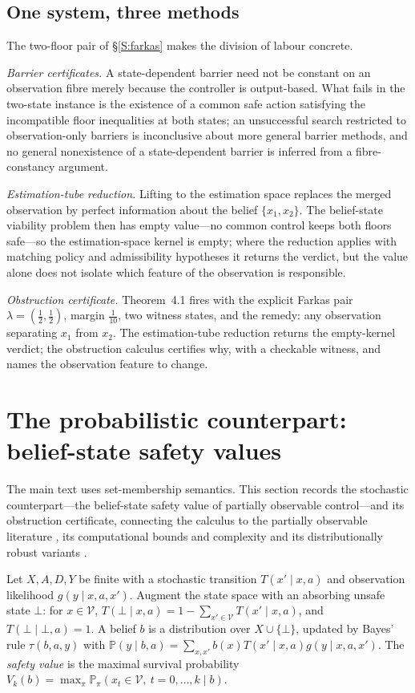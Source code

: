 \documentclass[11pt,a4paper]{article}
\theoremstyle{plain}
\theoremstyle{definition}
\theoremstyle{remark}
\newcommand{\cV}{\mathcal{V}}
\begin{document}
\subsection{One system, three methods}\label{S:threemethods}
The two-floor pair of \S\ref{S:farkas} makes the division of labour concrete.

\emph{Barrier certificates.} A state-dependent barrier need not be constant on an observation fibre merely because the controller is output-based. What fails in the two-state instance is the existence of a common safe action satisfying the incompatible floor inequalities at both states; an unsuccessful search restricted to observation-only barriers is inconclusive about more general barrier methods, and no general nonexistence of a state-dependent barrier is inferred from a fibre-constancy argument.

\emph{Estimation-tube reduction.} Lifting to the estimation space replaces the merged observation by perfect information about the belief $\{x_1,x_2\}$. The belief-state viability problem then has empty value---no common control keeps both floors safe---so the estimation-space kernel is empty; where the reduction applies with matching policy and admissibility hypotheses it returns the verdict, but the value alone does not isolate which feature of the observation is responsible.

\emph{Obstruction certificate.} Theorem~4.1 fires with the explicit Farkas pair $\lambda=(\tfrac12,\tfrac12)$, margin $\tfrac1{10}$, two witness states, and the remedy: any observation separating $x_1$ from $x_2$. The estimation-tube reduction returns the empty-kernel verdict; the obstruction calculus certifies why, with a checkable witness, and names the observation feature to change.
\section{The probabilistic counterpart: belief-state safety values}\label{S:prob}

The main text uses set-membership semantics. This section records the stochastic counterpart---the belief-state safety value of partially observable control---and its obstruction certificate, connecting the calculus to the partially observable literature \citep{astrom1965,smallwood1973}, its computational bounds and complexity \citep{lovejoy1991,papadimitriou1987} and its distributionally robust variants \citep{nakao2021}.

Let $X,A,D,Y$ be finite with a stochastic transition $T(x'\mid x,a)$ and observation likelihood $g(y\mid x,a,x')$. Augment the state space with an absorbing unsafe state $\bot$: for $x\in\cV$, $T(\bot\mid x,a)=1-\sum_{x'\in\cV}T(x'\mid x,a)$, and $T(\bot\mid\bot,a)=1$. A belief $b$ is a distribution over $X\cup\{\bot\}$, updated by Bayes' rule $\tau(b,a,y)$ with $\mathbb P(y\mid b,a)=\sum_{x,x'}b(x)T(x'\mid x,a)g(y\mid x,a,x')$. The \emph{safety value} is the maximal survival probability $V_k(b)=\max_\pi\mathbb P_\pi(x_t\in\cV,\ t=0,\dots,k\mid b)$.
\end{document}
